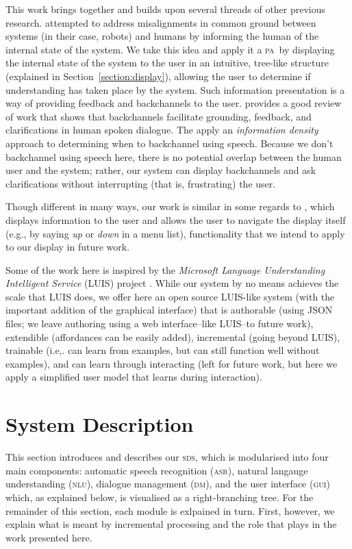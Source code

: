 \documentclass[11pt]{article}
\newcommand{\sds}[0]{\textsc{sds}}
\newcommand{\nlu}[0]{\textsc{nlu}}
\newcommand{\asr}[0]{\textsc{asr}}
\newcommand{\dm}[0]{\textsc{dm}}
\newcommand{\ui}[0]{\textsc{gui}}
\newcommand{\pa}[0]{\textsc{pa}}
\begin{document}
This work brings together and builds upon several threads of other previous research. \cite{Chai2014} attempted to address misalignments in common ground \cite{clarkschaefer:contrdis} between systems (in their case, robots) and humans by informing the human of the internal state of the system. We take this idea and apply it a \pa\ by displaying the internal state of the system to the user in an intuitive, tree-like structure (explained in Section~\ref{section:display}), allowing the user to determine if understanding has taken place by the system. Such information presentation is a way of providing feedback and backchannels to the user. \cite{Dethlefs2015} provides a good review of work that shows that backchannels facilitate grounding, feedback, and clarifications in human spoken dialogue. The apply an \emph{information density} approach to determining when to backchannel using speech. Because we don't backchannel using speech here, there is no potential overlap between the human user and the system; rather, our system can display backchannels and ask clarifications without interrupting (that is, frustrating) the user. 

Though different in many ways, our work is similar in some regards to \cite{Larsson2011}, which displays information to the user and allows the user to navigate the display itself (e.g., by saying \emph{up} or \emph{down} in a menu list), functionality that we intend to apply to our display in future work. 

Some of the work here is inspired by the \emph{Microsoft Language Understanding Intelligent Service} (LUIS) project \cite{Williams2015_sigdial}. While our system by no means achieves the scale that LUIS does, we offer here an open source LUIS-like system (with the important addition of the graphical interface) that is authorable (using JSON files; we leave authoring using a web interface--like LUIS--to future work), extendible (affordances can be easily added), incremental (going beyond LUIS), trainable (i.e,. can learn from examples, but can still function well without examples), and can learn through interacting (left for future work, but here we apply a simplified user model that learns during interaction). 

\section{System Description}
\label{section:system_def}

This section introduces and describes our \sds, which is modularised into four main components: automatic speech recognition (\asr), natural langauge understanding (\nlu), dialogue management (\dm), and the user interface (\ui) which, as explained below, is visualised as a right-branching tree. For the remainder of this section, each module is exlpained in turn. First, however, we explain what is meant by incremental processing and the role that plays in the work presented here. 
\end{document}
